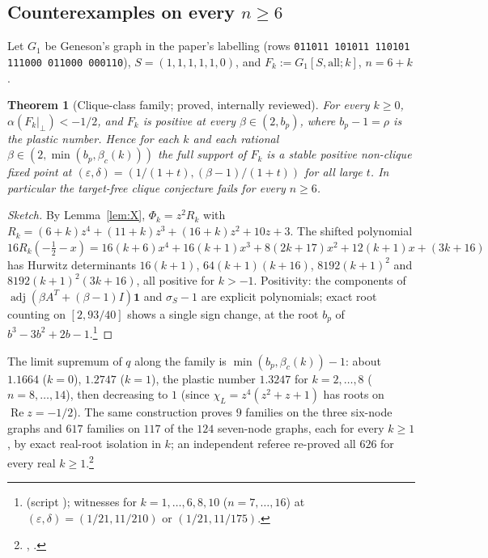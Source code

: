 \documentclass[11pt]{article}
\newtheorem{theorem}{Theorem}[section]
\theoremstyle{definition}
\newcommand{\one}{\mathbf{1}}
\newcommand{\eps}{\varepsilon}
\newcommand{\perpc}[1]{#1|_{\perp}}
\newcommand{\adj}{\operatorname{adj}}
\newcommand{\Rea}{\operatorname{Re}}
\begin{document}
{\subsection{Counterexamples on every \texorpdfstring{$n\ge6$}{n >= 6}}
Let $G_1$ be Geneson's graph in the paper's labelling (rows \texttt{011011 101011 110101 111000 011000 000110}), $S=(1,1,1,1,1,0)$,
and $F_k:=G_1[S,\text{all};k]$, $n=6+k$.

\begin{theorem}[Clique-class family; proved, internally reviewed]\label{thm:famF}
For every $k\ge0$, $\alpha(\perpc{F_k})<-1/2$, and $F_k$ is positive at every $\beta\in(2,b_p)$, where $b_p-1=\rho$ is the
plastic number. Hence for each $k$ and each rational $\beta\in(2,\min(b_p,\beta_c(k)))$ the full support of $F_k$ is a stable
positive non-clique fixed point at $(\eps,\delta)=(1/(1+t),(\beta-1)/(1+t))$ for all large $t$. In particular the target-free
clique conjecture fails for every $n\ge6$.
\end{theorem}
\begin{proof}[Sketch]
By Lemma~\ref{lem:X}, $\Phi_k=z^2R_k$ with $R_k=(6+k)z^4+(11+k)z^3+(16+k)z^2+10z+3$. The shifted polynomial
$16R_k(-\tfrac12-x)=16(k+6)x^4+16(k+1)x^3+8(2k+17)x^2+12(k+1)x+(3k+16)$ has Hurwitz determinants
$16(k+1)$, $64(k+1)(k+16)$, $8192(k+1)^2$ and $8192(k+1)^2(3k+16)$, all positive for $k>-1$. Positivity: the components of
$\adj(\beta A^T+(\beta-1)I)\one$ and $\sigma_S-1$ are explicit polynomials; exact root counting on $[2,93/40]$ shows a single
sign change, at the root $b_p$ of $b^3-3b^2+2b-1$.\footnote{ (script ); witnesses for $k=1,\dots,6,8,10$ ($n=7,\dots,16$) at $(\eps,\delta)=(1/21,11/210)$ or $(1/21,11/175)$.}
\end{proof}
The limit supremum of $q$ along the family is $\min(b_p,\beta_c(k))-1$: about $1.1664$ ($k=0$), $1.2747$ ($k=1$), the plastic
number $1.3247$ for $k=2,\dots,8$ ($n=8,\dots,14$), then decreasing to $1$ (since $\chi_L=z^4(z^2+z+1)$ has roots on
$\Rea z=-1/2$). The same construction proves $9$ families on the three six-node graphs and $617$ families on $117$ of the
$124$ seven-node graphs, each for every $k\ge1$, by exact real-root isolation in $k$; an independent referee re-proved all $626$
for every real $k\ge1$.\footnote{, .}

}
\end{document}

